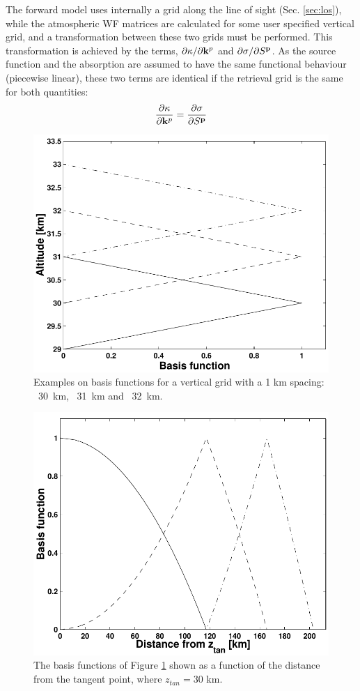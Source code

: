  
 The forward model uses
 internally a grid along the line of sight (Sec. \ref{sec:los}), while
 the atmospheric WF matrices are calculated for some user specified
 vertical grid, and a transformation between these two grids must be
 performed. This transformation is achieved by the terms,
 $\partial\kappa/ \partial \mathbf{k}^p$ and $\partial \sigma / \partial
 S^{\mathbf{p}}$. As the source function and the absorption are assumed to
 have the same functional behaviour (piecewise linear), these two
 terms are identical if the retrieval grid is the same for both quantities:
 \begin{equation}
   \frac{\partial \kappa}{\partial \mathbf{k}^p} =
   \frac{\partial \sigma}{\partial S^{\mathbf{p}}}
  \label{eq:wfuns:sandk}
 \end{equation}
 \begin{figure}[t]
  \begin{center}
   \includegraphics*[width=0.7\hsize]{Figs/fig_absbasis_z}
   \caption{Examples on basis functions for a vertical grid with a 1 km
            spacing: \lsolid~30~km, \ldashed~31~km and \ldashdot~32~km.}
   \label{fig:wfuns:zbasis}  
  \end{center}
 \end{figure}
 \begin{figure}[t]
  \begin{center}
   \includegraphics*[width=0.7\hsize]{Figs/fig_absbasis_l}
   \caption{The basis functions of Figure \ref{fig:wfuns:zbasis} shown
            as a function of the distance from the tangent point, where
            $z_{tan}=30$ km.}
   \label{fig:wfuns:lbasis}  
  \end{center}
 \end{figure}
